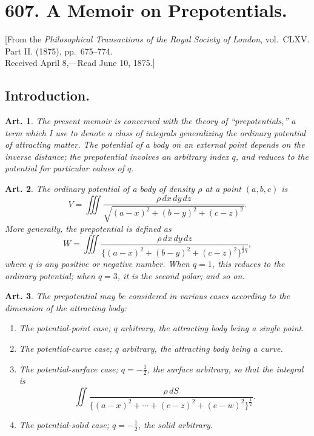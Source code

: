 \documentclass[12pt,a4paper]{article}
\theoremstyle{cayley}
\newtheorem{art}{Art.}[section]
\begin{document}
\newpage
\section[A Memoir on Prepotentials]%
{607. A Memoir on Prepotentials.}

\begin{center}
{\small [From the \textit{Philosophical Transactions of the Royal Society of London}, vol.~CLXV. Part II. (1875), pp.~675--774.\\
Received April 8,---Read June 10, 1875.]}
\end{center}

\subsection*{Introduction.}

\begin{art}
The present memoir is concerned with the theory of ``prepotentials,'' a term which I use to denote a class of integrals generalizing the ordinary potential of attracting matter. The potential of a body on an external point depends on the inverse distance; the prepotential involves an arbitrary index $q$, and reduces to the potential for particular values of $q$.
\end{art}

\begin{art}
The ordinary potential of a body of density $\rho$ at a point $(a, b, c)$ is
\[
V = \iiint \frac{\rho\,dx\,dy\,dz}{\sqrt{(a-x)^2 + (b-y)^2 + (c-z)^2}}.
\]
More generally, the prepotential is defined as
\[
W = \iiint \frac{\rho\,dx\,dy\,dz}{\{(a-x)^2 + (b-y)^2 + (c-z)^2\}^{\frac{1}{2}q}},
\]
where $q$ is any positive or negative number. When $q=1$, this reduces to the ordinary potential; when $q=3$, it is the second polar; and so on.
\end{art}

\begin{art}
The prepotential may be considered in various cases according to the dimension of the attracting body:
\begin{enumerate}
\item[A.] The potential-point case; $q$ arbitrary, the attracting body being a single point.
\item[B.] The potential-curve case; $q$ arbitrary, the attracting body being a curve.
\item[C.] The potential-surface case; $q = -\frac{1}{2}$, the surface arbitrary, so that the integral is
\[
\iint \frac{\rho\,dS}{\{(a-x)^2 + \cdots + (c-z)^2 + (e-w)^2\}^{\frac{1}{2}}}.
\]
\item[D.] The potential-solid case; $q = -\frac{1}{2}$, the solid arbitrary.
\end{enumerate}
\end{art}
\end{document}
